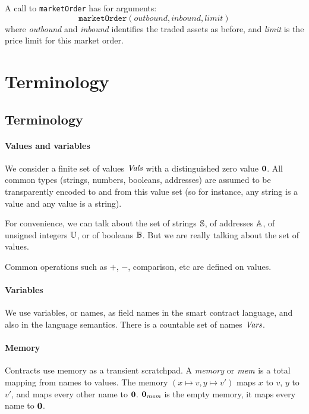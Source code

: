 \documentclass[12pt]{extarticle}
\begin{document}
A call to \texttt{marketOrder} has for arguments:
$$
\mathtt{marketOrder}(\mathit{outbound}, \mathit{inbound}, \mathit{limit})
$$
where \emph{outbound} and \emph{inbound} identifies the traded assets as before, and \emph{limit} is the price limit for this market order.

\section{Terminology}

\subsection{Terminology}
\paragraph{Values and variables}
We consider a finite set of values $\textit{Vals}$ with a distinguished zero value $\mathbf{0}$. All common types (strings, numbers, booleans, addresses) are assumed to be transparently encoded to and from this value set (so for instance, any string is a value and any value is a string).

For convenience, we can talk about the set of strings $\mathbb{S}$, of addresses $\mathbb{A}$, of unsigned integers $\mathbb{U}$, or of booleans $\mathbb{B}$. But we are really talking about the set of values.

Common operations such as $+$, $-$, comparison, etc are defined on values.

\paragraph{Variables}
We use variables, or names, as field names in the smart contract language, and also in the language semantics. There is a countable set of names $\textit{Vars}$. 

\paragraph{Memory}
Contracts use memory as a transient scratchpad.
A \emph{memory} or $\textit{mem}$ is a total mapping from names to values. The memory $(x\mapsto v,y\mapsto v')$ maps $x$ to $v$, $y$ to $v'$, and maps every other name to $\mathbf{0}$. $\mathbf{0}_{\textit{mem}}$ is the empty memory, it maps every name to $\mathbf{0}$.
\end{document}
